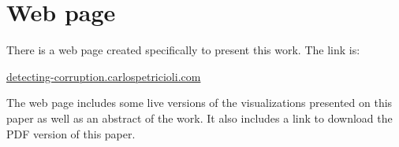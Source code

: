 \chapter*{Web page}


There is a web page created specifically to present this work. The link is:

\begin{center}
\Large{\href{http://detecting-corruption.carlospetricioli.com}{detecting-corruption.carlospetricioli.com}}
\end{center}
\normalsize

The web page includes some live versions of the visualizations presented on this paper as well as an abstract of the work. It also includes a link to download the PDF version of this paper.

\newpage


%  
% 
\thispagestyle{plain}
